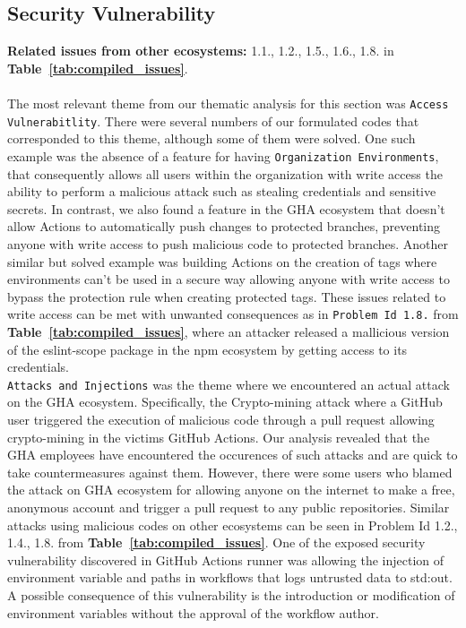\documentclass[conference]{IEEEtran}
\begin{document}
\subsection*{\textbf{Security Vulnerability}}
\textbf{Related issues from other ecosystems:} 1.1., 1.2., 1.5., 1.6., 1.8. in \textbf{Table~\ref{tab:compiled_issues}}.\\\\
The most relevant theme from our thematic analysis for this section was \texttt{Access Vulnerabitlity}. There were several numbers of our formulated codes that corresponded to this theme, although some of them were solved. One such example was the absence of a feature for having \texttt{Organization Environments}, that consequently allows all users within the organization with write access the ability to perform a malicious attack such as stealing credentials and sensitive secrets. In contrast, we also found a feature in the GHA ecosystem that doesn't allow Actions to automatically push changes to protected branches, preventing anyone with write access to push malicious code to protected branches. Another similar but solved example was building Actions on the creation of tags where environments can't be used in a secure way allowing anyone with write access to bypass the protection rule when creating protected tags.  These issues related to write access can be met with unwanted consequences as in \texttt{Problem Id 1.8.} from \textbf{Table~\ref{tab:compiled_issues}}, where an attacker released a mallicious version of the eslint-scope package in the npm ecosystem  by getting access to its credentials. \\
\texttt{Attacks and Injections} was the theme where we encountered an actual attack on the GHA ecosystem. Specifically, the Crypto-mining attack where a GitHub user triggered the execution of malicious code through a pull request allowing crypto-mining in the victims GitHub Actions. Our analysis revealed that the GHA employees have encountered the occurences of such attacks and are  quick to take countermeasures against them. However, there were some users who blamed the attack on GHA ecosystem for allowing anyone on the internet to make a free, anonymous account and trigger a pull request to any public repositories. Similar attacks using malicious codes on other ecosystems can be seen in Problem Id 1.2., 1.4., 1.8. from \textbf{Table~\ref{tab:compiled_issues}}. One of the exposed security vulnerability discovered in GitHub Actions runner was allowing the injection of environment variable and paths in workflows that logs untrusted data to std:out. A possible consequence of this vulnerability is the introduction or modification of environment variables without the approval of the workflow author.
\end{document}
